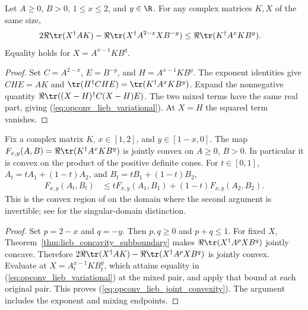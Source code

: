 \begin{theorem}
    \label{thm:lieb_convexity_variational_le}
    \leanok
    Let $A\geq0$, $B>0$, $1\leq x\leq2$, and $y\in\R$. For any
    complex matrices $K,X$ of the same size,
    \begin{align}
        2\Re\tr(X^\dagger AK)
        -\Re\tr(X^\dagger A^{2-x}XB^{-y})
        &\leq \Re\tr(K^\dagger A^xKB^y).
        \label{eq:opconv_lieb_variational}
    \end{align}
    Equality holds for $X=A^{x-1}KB^y$.
\end{theorem}

\begin{proof}\leanok
    Set $C=A^{2-x}$, $E=B^{-y}$, and $H=A^{x-1}KB^y$.
    The exponent identities give $CHE=AK$ and
    $\tr(H^\dagger CHE)=\tr(K^\dagger A^xKB^y)$.
    Expand the nonnegative quantity
    $\Re\tr((X-H)^\dagger C(X-H)E)$. The two mixed terms have
    the same real part, giving (\ref{eq:opconv_lieb_variational}).
    At $X=H$ the squared term vanishes.
\end{proof}

\begin{theorem}
    \label{thm:lieb_convexity_posDef}
    \leanok
    Fix a complex matrix $K$, $x\in[1,2]$, and $y\in[1-x,0]$.
    The map $F_{x,y}(A,B)=\Re\tr(K^\dagger A^xKB^y)$ is jointly
    convex on $A\geq0$, $B>0$. In particular it is convex on the
    product of the positive definite cones. For $t\in[0,1]$,
    $A_t=tA_1+(1-t)A_2$, and $B_t=tB_1+(1-t)B_2$,
    \begin{align}
        F_{x,y}(A_t,B_t)
        &\leq tF_{x,y}(A_1,B_1)+(1-t)F_{x,y}(A_2,B_2).
        \label{eq:opconv_lieb_joint_convexity}
    \end{align}
    This is the convex region of \cite[Theorem~5.15, Equation~(5.47)]{Wolf2012Quantum}
    on the domain where the second argument is invertible; see
    \cite{gap:wolf_ch5_lieb_convexity_domain} for the singular-domain distinction.
\end{theorem}

\begin{proof}\leanok
    Set $p=2-x$ and $q=-y$. Then $p,q\geq0$ and $p+q\leq1$.
    For fixed $X$, Theorem~\ref{thm:lieb_concavity_subboundary} makes
    $\Re\tr(X^\dagger A^pXB^q)$ jointly concave. Therefore
    $2\Re\tr(X^\dagger AK)-\Re\tr(X^\dagger A^pXB^q)$ is jointly convex.
    Evaluate at $X=A_t^{x-1}KB_t^y$, which attains equality in
    (\ref{eq:opconv_lieb_variational}) at the mixed pair, and apply that bound
    at each original pair. This proves (\ref{eq:opconv_lieb_joint_convexity}).
    The argument includes the exponent and mixing endpoints.
\end{proof}

